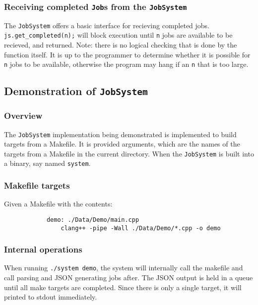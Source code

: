 \documentclass{article}
\begin{document}
		\subsubsection{Receiving completed \texttt{Job}s from the \texttt{JobSystem}}
			The \texttt{JobSystem} offers a basic interface for recieving completed jobs. \texttt{js.get\_completed(n);} will block execution until \texttt{n} jobs are available to be recieved, and returned. Note: there is no logical checking that is done by the function itself. It is up to the programmer to determine whether it is possible for \texttt{n} jobs to be available, otherwise the program may hang if an \texttt{n} that is too large.
	
	\subsection{Demonstration of \texttt{JobSystem}}
		\subsubsection{Overview}
			The \texttt{JobSystem} implementation being demonstrated is implemented to build targets from a Makefile. It is provided arguments, which are the names of the targets from a Makefile in the current directory. When the \texttt{JobSystem} is built into a binary, say named \texttt{system}.
			
		\subsubsection{Makefile targets}
			Given a Makefile with the contents:
			\begin{verbatim}
			demo: ./Data/Demo/main.cpp
				clang++ -pipe -Wall ./Data/Demo/*.cpp -o demo
			\end{verbatim}
		\subsubsection{Internal operations}
			When running \texttt{./system demo}, the system will internally call the makefile and call parsing and JSON generating jobs after. The JSON output is held in a queue until all make targets are completed. Since there is only a single target, it will printed to stdout immediately.
\end{document}
